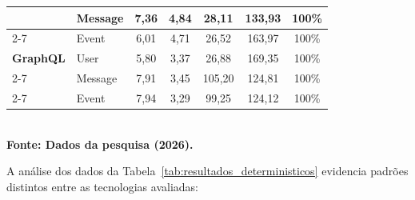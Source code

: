 \documentclass[a4paper,12pt]{article}
\begin{document}
\begin{table}[H]
\begin{tabularx}{\textwidth}{|l|l|c|c|c|c|c|}
 & Message & 7,36 & 4,84 & 28,11 & 133,93 & 100\% \\ \cline{2-7}
 & Event & 6,01 & 4,71 & 26,52 & 163,97 & 100\% \\ \hline
\textbf{GraphQL} & User & 5,80 & 3,37 & 26,88 & 169,35 & 100\% \\ \cline{2-7}
 & Message & 7,91 & 3,45 & 105,20 & 124,81 & 100\% \\ \cline{2-7}
 & Event & 7,94 & 3,29 & 99,25 & 124,12 & 100\% \\ \hline
\end{tabularx}
{\footnotesize\\ \textbf{Fonte: Dados da pesquisa (2026).}}
\end{table}

A análise dos dados da Tabela~\ref{tab:resultados_deterministicos} evidencia padrões distintos entre as tecnologias avaliadas:
\end{document}

